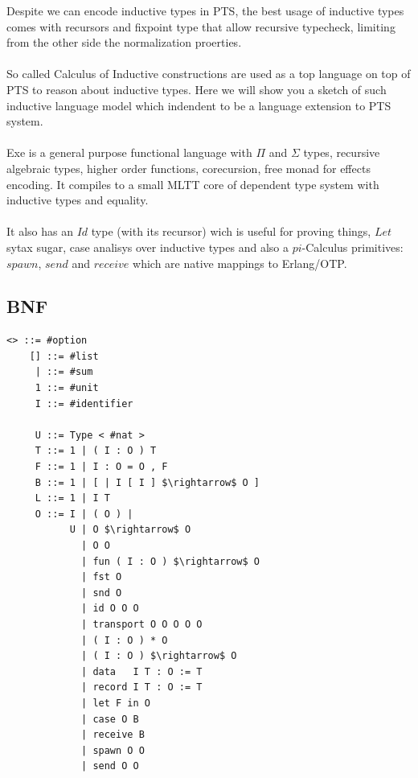 \documentclass[11pt,oneside]{article}
\begin{document}
Despite we can encode inductive types in PTS, the best usage of inductive types
comes with recursors and fixpoint type that allow recursive typecheck, limiting
from the other side the normalization proerties.

\paragraph{}
So called Calculus of Inductive constructions are used as a top language on top of
PTS to reason about inductive types. Here we will show you a sketch of such
inductive language model which indendent to be a language extension to PTS system.

\paragraph{}
Exe is a general purpose functional language with $\Pi$ and $\Sigma$ types,
recursive algebraic types, higher order functions,
corecursion, free monad for effects encoding. It compiles
to a small MLTT core of dependent type system with inductive types and equality.

\paragraph{}
It also has an $Id$ type (with its recursor) wich is useful for proving things,
$Let$ sytax sugar, case analisys over inductive types and also a $pi$-Calculus primitives:
$spawn$, $send$ and $receive$ which are native mappings to Erlang/OTP.

\subsection{BNF}


\begin{lstlisting}[mathescape=true]
    <> ::= #option
    [] ::= #list
     | ::= #sum
     1 ::= #unit
     I ::= #identifier

     U ::= Type < #nat >
     T ::= 1 | ( I : O ) T
     F ::= 1 | I : O = O , F
     B ::= 1 | [ | I [ I ] $\rightarrow$ O ]
     L ::= 1 | I T
     O ::= I | ( O ) |
           U | O $\rightarrow$ O
             | O O
             | fun ( I : O ) $\rightarrow$ O
             | fst O
             | snd O
             | id O O O
             | transport O O O O O
             | ( I : O ) * O
             | ( I : O ) $\rightarrow$ O
             | data   I T : O := T
             | record I T : O := T
             | let F in O
             | case O B
             | receive B
             | spawn O O
             | send O O
\end{lstlisting}
\end{document}
